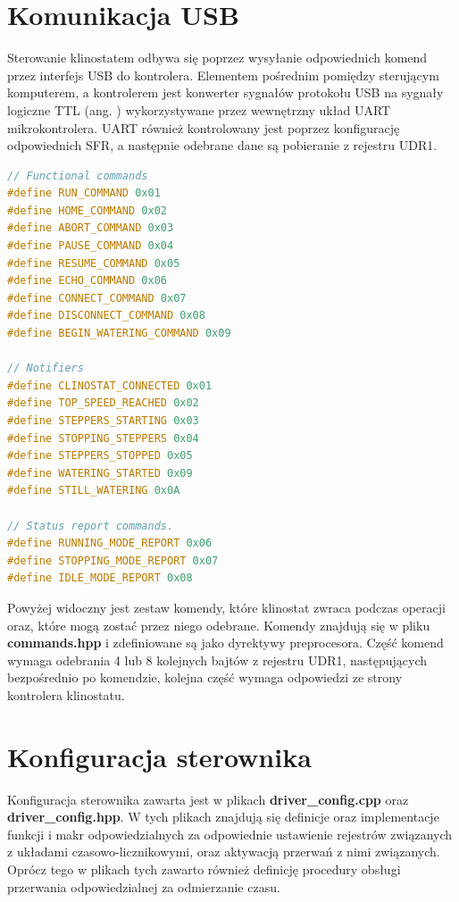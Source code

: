 \section{Komunikacja USB}

Sterowanie klinostatem odbywa się poprzez wysyłanie odpowiednich komend przez interfejs USB do kontrolera. Elementem pośrednim pomiędzy sterującym komputerem, a kontrolerem jest konwerter sygnałów protokołu USB na sygnały logiczne TTL (ang. ) wykorzystywane przez wewnętrzny układ UART mikrokontrolera. UART również kontrolowany jest poprzez konfigurację odpowiednich SFR, a następnie odebrane dane są pobieranie z rejestru UDR1.
\begin{lstlisting}[language=C++, caption=Plik \textbf{commands.hpp}.]
// Functional commands	
#define RUN_COMMAND 0x01
#define HOME_COMMAND 0x02
#define ABORT_COMMAND 0x03
#define PAUSE_COMMAND 0x04
#define RESUME_COMMAND 0x05
#define ECHO_COMMAND 0x06
#define CONNECT_COMMAND 0x07
#define DISCONNECT_COMMAND 0x08
#define BEGIN_WATERING_COMMAND 0x09

// Notifiers
#define CLINOSTAT_CONNECTED 0x01
#define TOP_SPEED_REACHED 0x02
#define STEPPERS_STARTING 0x03
#define STOPPING_STEPPERS 0x04
#define STEPPERS_STOPPED 0x05
#define WATERING_STARTED 0x09
#define STILL_WATERING 0x0A

// Status report commands.
#define RUNNING_MODE_REPORT 0x06
#define STOPPING_MODE_REPORT 0x07
#define IDLE_MODE_REPORT 0x08
\end{lstlisting}
Powyżej widoczny jest zestaw komendy, które klinostat zwraca podczas operacji oraz, które mogą zostać przez niego odebrane. Komendy znajdują się w pliku \textbf{commands.hpp} i zdefiniowane są jako dyrektywy preprocesora. Część komend wymaga odebrania 4 lub 8 kolejnych bajtów z rejestru UDR1, następujących bezpośrednio po komendzie, kolejna część wymaga odpowiedzi ze strony kontrolera klinostatu.

\section{Konfiguracja sterownika}

Konfiguracja sterownika zawarta jest w plikach \textbf{driver\_config.cpp} oraz \textbf{driver\_config.hpp}. W tych plikach znajdują się definicje oraz implementacje funkcji i makr odpowiedzialnych za odpowiednie ustawienie rejestrów związanych z układami czasowo-licznikowymi, oraz aktywacją przerwań z nimi związanych. Oprócz tego w plikach tych zawarto również definicję procedury obsługi przerwania odpowiedzialnej za odmierzanie czasu.

